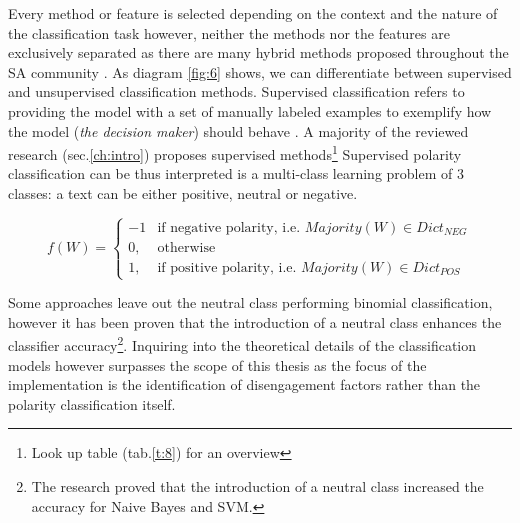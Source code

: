 \documentclass[
	a4paper,
	pdftex,
	12pt,	
	footinclude=true,
	fleqn,
	final,
	]{report}%
\begin{document}
Every method or feature is selected depending on the context and the nature of the classification task \cite{Liu2012}
however, neither the methods nor the features are exclusively separated as there are many hybrid methods proposed
throughout the SA community \cite{Liu2012a,Serrano2015}. As diagram \ref{fig:6} shows, we can differentiate between 
supervised and unsupervised classification methods. Supervised classification refers to providing the model with a 
set of manually labeled examples to exemplify how the model (\emph{the decision maker}) should behave \cite{Manning1999}. 
A majority of the reviewed research (sec.\ref{ch:intro}) proposes supervised methods\footnote{Look up table (tab.\ref{t:8}) for an overview} 
Supervised polarity classification can be thus interpreted is a multi-class learning 
problem of 3 classes: a text can be either positive, neutral or negative.
\vspace{-0.5cm}
\begin{center}
\[
    f(W)= 
\begin{cases}
    -1 			& \text{if negative polarity,  i.e. } Majority(W) \in Dict_{NEG} \\
     0,              	& \text{otherwise}\\
     1,			& \text{if positive polarity,  i.e. } Majority(W) \in Dict_{POS}
\end{cases}
\]
\end{center}
Some approaches \cite{Rose2014,Adamopoulos2013,Pang2008} leave out the neutral class performing binomial classification, 
however it has been proven \cite{Serrano2015,Medhat2014} that the introduction of a neutral class enhances the classifier 
accuracy\footnote{The research proved that the introduction of a neutral class increased the accuracy for Naive Bayes and SVM.}.
Inquiring into the theoretical details of the classification models however surpasses the scope of this thesis
as the focus of the implementation is the identification of disengagement factors rather than the
polarity classification itself. 

\vspace{-0.45cm}
\end{document}

